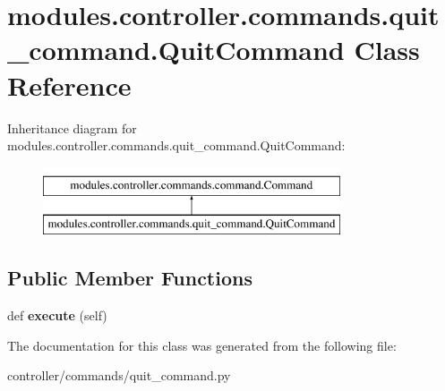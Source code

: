 \hypertarget{classmodules_1_1controller_1_1commands_1_1quit__command_1_1_quit_command}{}\section{modules.\+controller.\+commands.\+quit\+\_\+command.\+Quit\+Command Class Reference}
\label{classmodules_1_1controller_1_1commands_1_1quit__command_1_1_quit_command}
Inheritance diagram for modules.\+controller.\+commands.\+quit\+\_\+command.\+Quit\+Command\+:\begin{figure}[H]
\begin{center}
\leavevmode
\includegraphics[height=2.000000cm]{classmodules_1_1controller_1_1commands_1_1quit__command_1_1_quit_command}
\end{center}
\end{figure}
\subsection*{Public Member Functions}
\begin{DoxyCompactItemize}
\item 
\mbox{\label{classmodules_1_1controller_1_1commands_1_1quit__command_1_1_quit_command_a6eb669d9493b50e50f09027fe6d06f4c}} 
def {\bfseries execute} (self)
\end{DoxyCompactItemize}


The documentation for this class was generated from the following file\+:\begin{DoxyCompactItemize}
\item 
controller/commands/quit\+\_\+command.\+py\end{DoxyCompactItemize}
